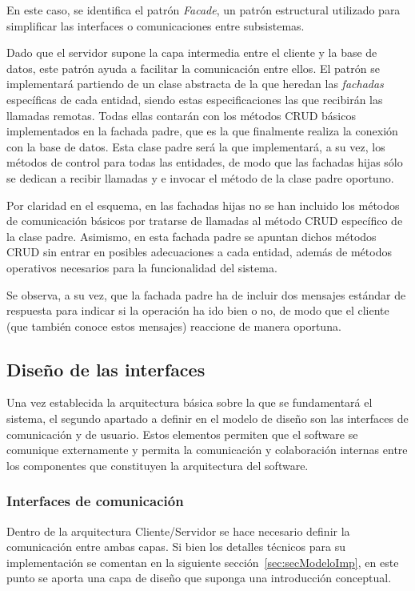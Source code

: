 En este caso, se identifica el patrón \emph{Facade}, un patrón estructural utilizado para simplificar las interfaces o comunicaciones entre subsistemas.

Dado que el servidor supone la capa intermedia entre el cliente y la base de datos, este patrón ayuda a facilitar la comunicación entre ellos. El patrón se implementará partiendo de un clase abstracta de la que heredan las \emph{fachadas} específicas de cada entidad, siendo estas especificaciones las que recibirán las llamadas remotas. Todas ellas contarán con los métodos CRUD básicos implementados en la fachada padre, que es la que finalmente realiza la conexión con la base de datos. Esta clase padre será la que implementará, a su vez, los métodos de control para todas las entidades, de modo que las fachadas hijas sólo se dedican a recibir llamadas y e invocar el método de la clase padre oportuno.

Por claridad en el esquema, en las fachadas hijas no se han incluido los métodos de comunicación básicos por tratarse de llamadas al método CRUD específico de la clase padre. Asimismo, en esta fachada padre se apuntan dichos métodos CRUD sin entrar en posibles adecuaciones a cada entidad, además de métodos operativos necesarios para la funcionalidad del sistema.

Se observa, a su vez, que la fachada padre ha de incluir dos mensajes estándar de respuesta para indicar si la operación ha ido bien o no, de modo que el cliente (que también conoce estos mensajes) reaccione de manera oportuna.

\subsection{Diseño de las interfaces}
\label{subsec:disenoInterfaces}

Una vez establecida la arquitectura básica sobre la que se fundamentará el sistema, el segundo apartado a definir en el modelo de diseño son las interfaces de comunicación y de usuario. Estos elementos permiten que el software se comunique externamente y permita la comunicación y colaboración internas entre los componentes que constituyen la arquitectura del software.

\subsubsection{Interfaces de comunicación}

Dentro de la arquitectura Cliente/Servidor se hace necesario definir la comunicación entre ambas capas. Si bien los detalles técnicos para su implementación se comentan en la siguiente sección~\ref{sec:secModeloImp}, en este punto se aporta una capa de diseño que suponga una introducción conceptual. 

